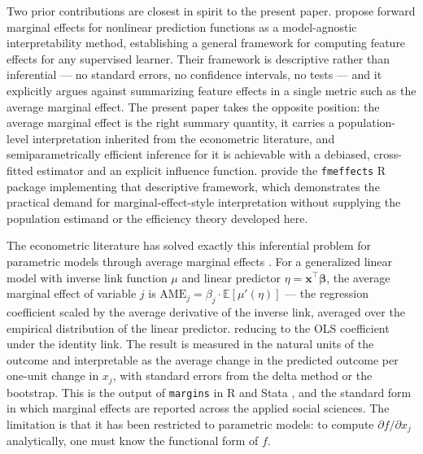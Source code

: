 \documentclass[12pt,a4paper]{article}
\numberwithin{equation}{section}
\theoremstyle{plain}
\theoremstyle{definition}
\begin{document}
	Two prior contributions are closest in spirit to the present paper.
	\citet{scholbeck2024fme} propose forward marginal effects for nonlinear prediction
	functions as a model-agnostic interpretability method, establishing a general
	framework for computing feature effects for any supervised learner. Their framework
	is descriptive rather than inferential --- no standard errors, no confidence
	intervals, no tests --- and it explicitly argues against summarizing feature
	effects in a single metric such as the average marginal effect. The present
	paper takes the opposite position: the average marginal effect is the right
	summary quantity, it carries a population-level interpretation inherited from
	the econometric literature, and semiparametrically efficient inference for it
	is achievable with a debiased, cross-fitted estimator and an explicit
	influence function. \citet{lowe2024fmeffects} provide the \texttt{fmeffects} R
	package implementing that descriptive framework, which demonstrates the
	practical demand for marginal-effect-style interpretation without supplying
	the population estimand or the efficiency theory developed here.
	
	The econometric literature has solved exactly this inferential problem for parametric
	models through average marginal effects \citep{greene2012, wooldridge2010}. For a
	generalized linear model with inverse link function $\mu$ and linear predictor
	$\eta = \mathbf{x}^\top \boldsymbol{\beta}$, the average marginal effect of variable
	$j$ is $\mathrm{AME}_j = \beta_j \cdot \mathbb{E}[\mu'(\eta)]$ --- the regression
	coefficient scaled by the average derivative of the inverse link, averaged over the
	empirical distribution of the linear predictor. reducing to the OLS coefficient under the identity link. The result is
	measured in the natural units of the outcome and interpretable as the average
	change in the predicted outcome per one-unit change in $x_j$, with standard
	errors from the delta method or the bootstrap. This is the output of
	\texttt{margins} in R and Stata \citep{leeper2021}, and the standard form in
	which marginal effects are reported across the applied social sciences. The
	limitation is that
	it has been restricted to parametric models: to compute $\partial f / \partial x_j$
	analytically, one must know the functional form of $f$.
	
\end{document}
